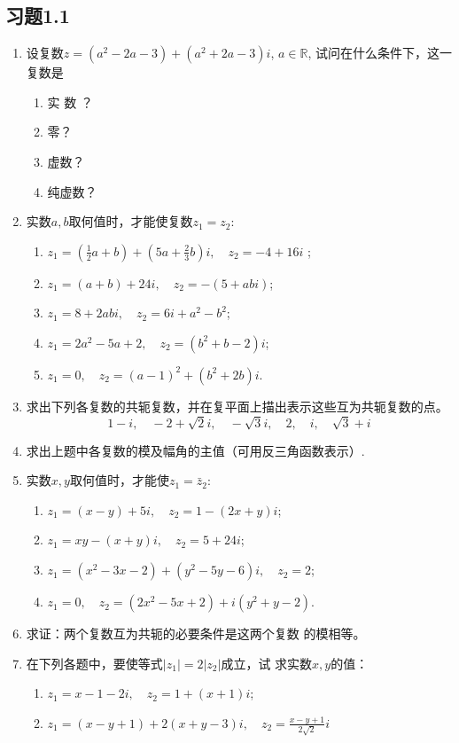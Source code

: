 \subsection*{习题1.1}
\begin{enumerate}
    \item 设复数$z= (a^{2}- 2a- 3 )+( a^{2}+ 2a- 3) i$, $a\in \mathbb{R} $, 
试问在什么条件下，这一复数是
\begin{multicols}{4}
\begin{enumerate}[(1)]
    \item 实 数 ？
    \item 零？
    \item 虚数？
    \item 纯虚数？
\end{enumerate}
\end{multicols}

\item 实数$a,b$取何值时，才能使复数$z_1=z_2$:
\begin{enumerate}[(1)]
    \item $z_{1}= \left(\frac{1}{2}a+ b \right)+\left( 5a+\frac{2}{3}b \right) i,\quad z_{2}= - 4+ 16i$ ;
    \item $z_{1}=(a+b)+24i,\quad z_{2}=-(5+abi)$;
    \item $z_{1}=8+2abi,\quad z_{2}=6i+a^{2}-b^{2}$;
    \item $z_{1}=2a^{2}-5a+2,\quad z_{2}=(b^{2}+b-2)i$;
    \item $z_{1}= 0,\quad z_{2}= (a- 1)^{2}+ (b^{2}+ 2b)i$.
\end{enumerate}
\item 求出下列各复数的共轭复数，并在复平面上描出表示这些互为共轭复数的点。
\[1- i, \quad - 2+ \sqrt {2}i, \quad - \sqrt {3}i, \quad 2, \quad i, \quad \sqrt {3}+ i\]
\item 求出上题中各复数的模及幅角的主值（可用反三角函数表示）.
\item 实数$x,y$取何值时，才能使$z_1=\bar z_2$:
\begin{enumerate}[(1)]
    \item $z_{1}=( x-y )+5i,\quad  z_{2}=1-( 2x+y ) i$;
    \item $z_{1}=xy-( x+y)i,\quad  z_{2}=5+24 i$; 
    \item $z_{1}=( x^{2}-3x-2 )+( y^{2}-5y-6 ) i,\quad z_{2}=2$;
    \item $z_1=0,\quad z_2=(2x^2-5x+2)+i(y^2+y-2)$.
\end{enumerate}


\item 求证：两个复数互为共轭的必要条件是这两个复数
的模相等。
\item  在下列各题中，要使等式$| z_1|=2| z_2|$成立，试
求实数$x,y$的值：
\begin{enumerate}[(1)]
    \item $z_{1}=x-1-2i,\quad  z_{2}=1+( x+1 )i$;
    \item $z_{1}=( x-y+1 )+2 ( x+y-3 )i,\quad z_{2}=\frac{x-y+1}{2\sqrt{2}}i $
\end{enumerate}


\end{enumerate}
